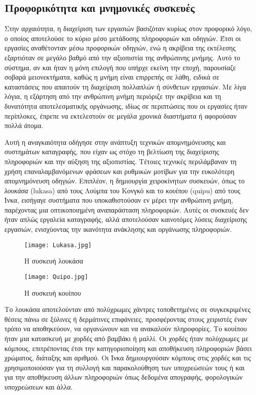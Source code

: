         \subsection{Προφορικότητα και μνημονικές συσκευές}
            Στην αρχαιότητα, η διαχείριση των εργασιών βασιζόταν κυρίως στον προφορικό λόγο, ο οποίος αποτελούσε το κύριο μέσο μετάδοσης πληροφοριών και οδηγιών. Έτσι οι εργασίες αναθέτονταν μέσω προφορικών οδηγιών, ενώ η ακρίβεια της εκτέλεσης εξαρτιόταν σε μεγάλο βαθμό από την αξιοπιστία της ανθρώπινης μνήμης. Αυτό το σύστημα, αν και ήταν η μόνη επιλογή που υπήρχε εκείνη την εποχή, παρουσίαζε σοβαρά μειονεκτήματα, καθώς η μνήμη είναι επιρρεπής σε λάθη, ειδικά σε καταστάσεις που απαιτούν τη διαχείριση πολλαπλών ή σύνθετων εργασιών. Με λίγα λόγια, η εξάρτηση από την ανθρώπινη μνήμη περιόριζε την ακρίβεια και τη δυνατότητα αποτελεσματικής οργάνωσης, ιδίως σε περιπτώσεις που οι εργασίες ήταν περίπλοκες, έπρεπε να εκτελεστούν σε μεγάλα χρονικά διαστήματα ή αφορούσαν πολλά άτομα. \cite{Goody2013}

            Αυτή η αναγκαιότητα οδήγησε στην ανάπτυξη τεχνικών απομνημόνευσης και συστημάτων καταγραφής, που είχαν ως στόχο τη βελτίωση της διαχείρισης πληροφοριών και την αύξηση της αξιοπιστίας. Τέτοιες τεχνικές περιλάμβαναν τη χρήση επαναλαμβανόμενων φράσεων και ρυθμικών μοτίβων για την ευκολότερη απομνημόνευση οδηγιών. Επιπλέον, η δημιουργία χειροκίνητων συσκευών, όπως το \textit{λουκάσα} (lukasa) από τους Λούμπα του Κονγκό και το \textit{κουίπου} (quipu) από τους Ίνκα, εισήγαγε συστήματα που υποκαθιστούσαν εν μέρει την ανθρώπινη μνήμη, παρέχοντας μια οπτικοποιημένη αναπαράσταση πληροφοριών. Αυτές οι συσκευές δεν ήταν απλώς εργαλεία καταγραφής, αλλά αποτελούσαν καινοτόμες λύσεις διαχείρισης εργασιών, ενισχύοντας την ικανότητα ανάκλησης και οργάνωσης πληροφοριών.

            \begin{figure}[h!] \noindent \centering
                \texttt{[image: Lukasa.jpg]}
                \caption{Η συσκευή λουκάσα}
            \end{figure}

            \begin{figure}[h!] \noindent \centering
                \texttt{[image: Quipo.jpg]}
                \caption{Η συσκευή κουίπου}
            \end{figure}

            Το λουκάσα αποτελούνταν από πολύχρωμες χάντρες τοποθετημένες σε συγκεκριμένες θέσεις πάνω σε ξύλινες ή δερμάτινες επιφάνειες, προσφέροντας στους χειριστές έναν τρόπο να αποθηκεύουν, να οργανώνουν και να ανακαλούν πληροφορίες. \cite{Lukasa} Το κουίπου ήταν μια κατασκευή με χορδές από βαμβάκι ή μαλλί. Οι χορδές ήταν πολύχρωμες με κόμπους, επιτρέποντας έτσι την κατηγοριοποίηση και αποθήκευση πληροφοριών βάσει χρώματος, διάταξης και αριθμού. Οι Ίνκα δημιουργούσαν κόμπους στις χορδές και τις χρησιμοποιούσαν για τη συλλογή και παρακολούθηση των υποχρεώσεών τους ή και για την αποθήκευση άλλων πληροφοριών όπως δεδομένα απογραφής, φορολογικών υποχρεώσεων και άλλα. \cite{Quipu}

